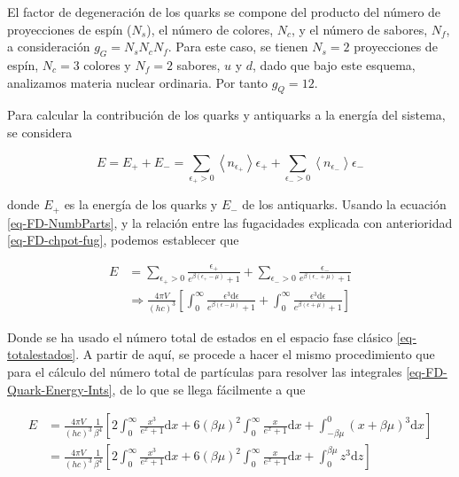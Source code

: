 El factor de degeneración de los quarks se compone del producto del número de proyecciones de espín (${N}_{s}$), el número de colores, ${N}_{c}$, y el número de sabores, ${N}_{f}$, a consideración ${g}_{G}={N}_{s}{N}_{c}{N}_{f}$. Para este caso, se tienen ${N}_{s}=2$ proyecciones de espín, ${N}_{c}=3$ colores y ${N}_{f}=2$ sabores, $u$ y $d$, dado que bajo este esquema, analizamos materia nuclear ordinaria. Por tanto ${g}_{Q}=12$.

Para calcular la contribución de los quarks y antiquarks a la energía del sistema, se considera

\begin{equation}
E = {E}_{+} + {E}_{-} = \sum_{{\epsilon}_{+}>0} \left\langle{n}_{{\epsilon}_{+}} \right\rangle {\epsilon}_{+} + \sum_{{\epsilon}_{-}>0} \left\langle{n}_{{\epsilon}_{-}} \right\rangle {\epsilon}_{-} 
\end{equation}

donde ${E}_{+}$ es la energía de los quarks y ${E}_{-}$ de los antiquarks. Usando la ecuación \eqref{eq-FD-NumbParts}, y la relación entre las fugacidades explicada con anterioridad \eqref{eq-FD-chpot-fug}, podemos establecer que 

\begin{equation}\label{eq-FD-Quark-Energy-Ints}
\begin{split}
E & = \sum_{{\epsilon}_{+} > 0} \frac{{\epsilon}_{+}}{{e}^{\beta({\epsilon}_{+}-\mu)} + 1} + \sum_{{\epsilon}_{-} > 0} \frac{{\epsilon}_{-}}{{e}^{\beta({\epsilon}_{-}+\mu)} + 1} \\
& \Rightarrow \frac{4{\pi}V}{(hc)^{3}} \left[ \int_{0}^{\infty}  \frac{{\epsilon}^{3} \mathrm{d} \epsilon}{{e}^{\beta({\epsilon}-\mu)} + 1}+ \int_{0}^{\infty}\frac{{\epsilon}^{3} \mathrm{d} \epsilon}{{e}^{\beta({\epsilon}+\mu)} + 1} \right]
\end{split}
\end{equation}

Donde se ha usado el número total de estados en el espacio fase clásico \eqref{eq-totalestados}. A partir de aquí, se procede a hacer el mismo procedimiento que para el cálculo del número total de partículas para resolver las integrales \eqref{eq-FD-Quark-Energy-Ints}, de lo que se llega fácilmente a que 

\begin{equation}\label{eq-FD-Quark-Energy-Ints2}
\begin{split}
E & = \frac{4\pi V}{(hc)^{3}} \frac{1}{{\beta}^{4}} \left[2\int_{0}^{\infty} \frac{{x}^{3}}{{e}^{x} + 1} \mathrm{d}x + 6(\beta \mu)^{2} \int_{0}^{\infty} \frac{x}{{e}^{x}+1} \mathrm{d}x + \int_{-\beta \mu}^{0} \left(x + \beta \mu \right)^{3} \mathrm{d}x \right] \\
& = \frac{4\pi V}{(hc)^{3}} \frac{1}{{\beta}^{4}} \left[2\int_{0}^{\infty} \frac{{x}^{3}}{{e}^{x} + 1} \mathrm{d}x + 6(\beta \mu)^{2} \int_{0}^{\infty} \frac{x}{{e}^{x}+1} \mathrm{d}x + \int_{0}^{\beta \mu} {z}^{3} \mathrm{d}z \right]
\end{split}
\end{equation}

